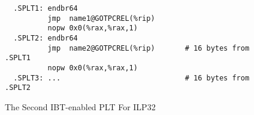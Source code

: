\begin{figure}[H]
\Hrule
\caption{The Second IBT-enabled PLT For ILP32}
\label{ibt_sec_small_med_plt_ipl32}
\begin{footnotesize}
\begin{verbatim}
  .SPLT1: endbr64
          jmp  name1@GOTPCREL(%rip)
          nopw 0x0(%rax,%rax,1)
  .SPLT2: endbr64
          jmp  name2@GOTPCREL(%rip)       # 16 bytes from .SPLT1
          nopw 0x0(%rax,%rax,1)
  .SPLT3: ...                             # 16 bytes from .SPLT2
\end{verbatim}%
\end{footnotesize}
\Hrule
\end{figure}

